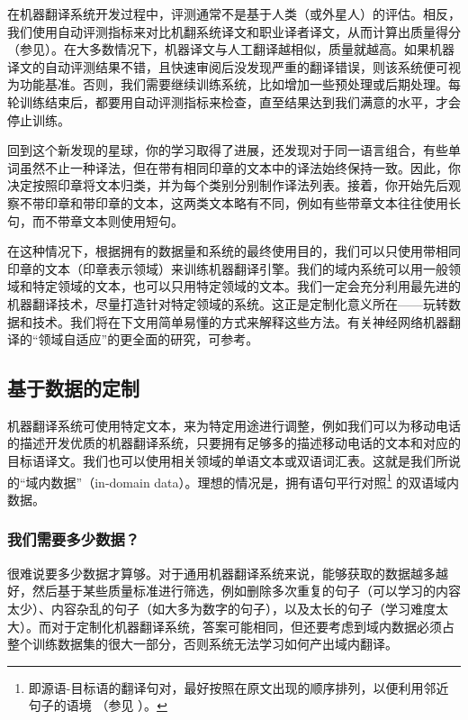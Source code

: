 \documentclass[output=paper]{langscibook}
\begin{document}
在机器翻译系统开发过程中，评测通常不是基于人类（或外星人）的评估。相反，我们使用自动评测指标来对比机翻系统译文和职业译者译文，从而计算出质量得分（参见）。在大多数情况下，机器译文与人工翻译越相似，质量就越高。如果机器译文的自动评测结果不错，且快速审阅后没发现严重的翻译错误，则该系统便可视为功能基准。否则，我们需要继续训练系统，比如增加一些预处理或后期处理。每轮训练结束后，都要用自动评测指标来检查，直至结果达到我们满意的水平，才会停止训练。

回到这个新发现的星球，你的学习取得了进展，还发现对于同一语言组合，有些单词虽然不止一种译法，但在带有相同印章的文本中的译法始终保持一致。因此，你决定按照印章将文本归类，并为每个类别分别制作译法列表。接着，你开始先后观察不带印章和带印章的文本，这两类文本略有不同，例如有些带章文本往往使用长句，而不带章文本则使用短句。

在这种情况下，根据拥有的数据量和系统的最终使用目的，我们可以只使用带相同印章的文本（印章表示领域）来训练机器翻译引擎。我们的域内系统可以用一般领域和特定领域的文本，也可以只用特定领域的文本。我们一定会充分利用最先进的机器翻译技术，尽量打造针对特定领域的系统。这正是定制化意义所在——玩转数据和技术。我们将在下文用简单易懂的方式来解释这些方法。有关神经网络机器翻译的“领域自适应”的更全面的研究，可参考\citet{Saunders2021}。


\subsection{基于数据的定制}\label{sec:ramirez:2.1}
机器翻译系统可使用特定文本，来为特定用途进行调整，例如我们可以为移动电话的描述开发优质的机器翻译系统，只要拥有足够多的描述移动电话的文本和对应的目标语译文。我们也可以使用相关领域的单语文本或双语词汇表。这就是我们所说的“域内数据”（in-domain data）。理想的情况是，拥有语句平行对照\footnote{即源语-目标语的翻译句对，最好按照在原文出现的顺序排列，以便利用邻近句子的语境 （参见 ）。} 的双语域内数据。

\subsubsection{我们需要多少数据？}\label{sec:howmuch}
很难说要多少数据才算够。对于通用机器翻译系统来说，能够获取的数据越多越好，然后基于某些质量标准进行筛选，例如删除多次重复的句子（可以学习的内容太少）、内容杂乱的句子（如大多为数字的句子），以及太长的句子（学习难度太大）。而对于定制化机器翻译系统，答案可能相同，但还要考虑到域内数据必须占整个训练数据集的很大一部分，否则系统无法学习如何产出域内翻译。
\end{document}
